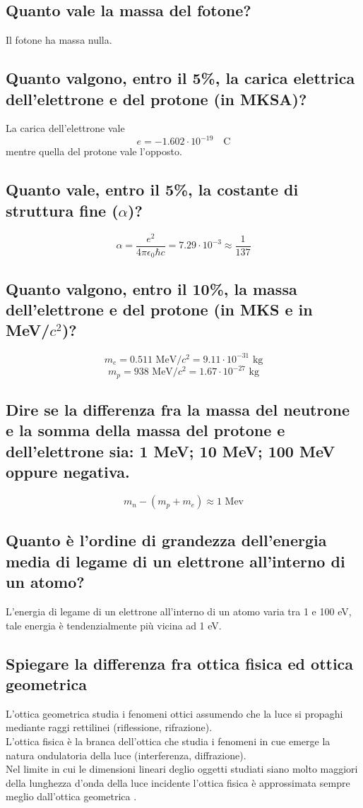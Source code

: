 \subsection[]{ Quanto vale la massa del fotone?}
Il fotone ha massa nulla.
\subsection[]{ Quanto valgono, entro il 5\%, la carica elettrica dell’elettrone e del protone (in MKSA)?}
La carica dell'elettrone vale 
\[
	e = -1.602 \cdot 10^{-19} \quad \text{C}
\]
 mentre quella del protone vale l'opposto. 

\subsection[]{ Quanto vale, entro il 5\%, la costante di struttura fine ($\alpha$)?}
\[
	\alpha = \frac{e^{2}}{4\pi \epsilon_0 \hbar c} = 7.29 \cdot 10^{-3} \approx \frac{1}{137}
\] 	
\subsection[]{ Quanto valgono, entro il 10\%, la massa dell’elettrone e del protone (in MKS e in MeV/$c^2$)?}
\[
m_{e} = 0.511 \text{ MeV/$c^{2}$} = 9.11 \cdot 10^{-31} \text{ kg}
\] 
\[
m_{p} = 938 \text{ MeV/$c^{2}$} = 1.67 \cdot 10^{-27} \text{ kg}
\] 
\subsection[]{Dire se la differenza fra la massa del neutrone e la somma della massa del protone e dell’elettrone sia: 1 MeV; 10 MeV; 100 MeV oppure negativa.}
\[
	m_n - \left( m_p + m_e \right) \approx 1 \text{ Mev} 
\] 
\subsection[]{Quanto è l’ordine di grandezza dell’energia media di legame di un elettrone all’interno di un atomo?}
L'energia di legame di un elettrone all'interno di un atomo varia tra 1 e 100 eV, tale energia è tendenzialmente più vicina ad 1 eV.
\subsection[]{Spiegare la differenza fra ottica fisica ed ottica geometrica}
L'ottica geometrica studia i fenomeni ottici assumendo che la luce si propaghi mediante raggi rettilinei (riflessione, rifrazione).\\ 
L'ottica fisica è la branca dell'ottica che studia i fenomeni in cue emerge la natura ondulatoria della luce (interferenza, diffrazione).\\
Nel limite in cui le dimensioni lineari deglio oggetti studiati siano molto maggiori della lunghezza d'onda della luce incidente l'ottica fisica è approssimata sempre meglio dall'ottica geometrica .
